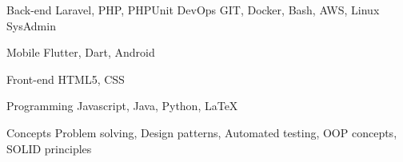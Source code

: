

\begin{cvskills}

  \cvskill
    {Back-end} %
    {
      Laravel, PHP, PHPUnit
    } %
  \cvskill
    {DevOps} %
    {GIT, Docker, Bash, AWS, Linux SysAdmin} %

  \cvskill
    {Mobile} %
    {Flutter, Dart, Android} %

  \cvskill
    {Front-end} %
    {HTML5, CSS} %

  \cvskill
    {Programming} %
    {Javascript, Java, Python, LaTeX} %

  \cvskill
    {Concepts} %
    {Problem solving, Design patterns, Automated testing, OOP concepts, SOLID principles} %

\end{cvskills}

